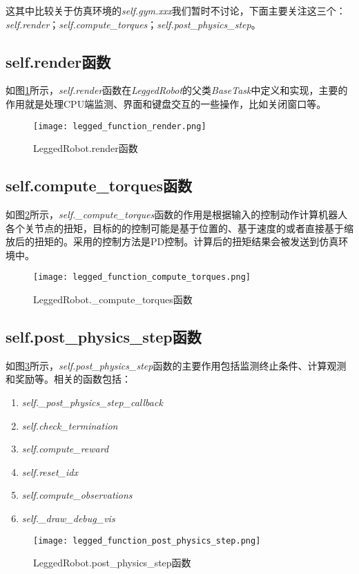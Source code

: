 这其中比较关于仿真环境的\emph{self.gym.xxx}我们暂时不讨论，下面主要关注这三个：\emph{self.render}；\emph{self.compute\_torques}；\emph{self.post\_physics\_step}。



\subsection[self.render函数]{self.render函数}
如图\ref{fig:legged_function_render}所示，\emph{self.render}函数在\emph{LeggedRobot}的父类\emph{BaseTask}中定义和实现，主要的作用就是处理CPU端监测、界面和键盘交互的一些操作，比如关闭窗口等。
\begin{figure}
  \centering
  \caption[LeggedRobot.render函数]{LeggedRobot.render函数}
  \label{fig:legged_function_render}
  \texttt{[image: legged\_function\_render.png]}
\end{figure}

\subsection[self.compute\_torques函数]{self.compute\_torques函数}
如图\ref{fig:legged_function_compute_torques}所示，\emph{self.\_compute\_torques}函数的作用是根据输入的控制动作计算机器人各个关节点的扭矩，目标的的控制可能是基于位置的、基于速度的或者直接基于缩放后的扭矩的。采用的控制方法是PD控制。计算后的扭矩结果会被发送到仿真环境中。
\begin{figure}
  \centering
  \caption[LeggedRobot.\_compute\_torques函数]{LeggedRobot.\_compute\_torques函数}
  \label{fig:legged_function_compute_torques}
  \texttt{[image: legged\_function\_compute\_torques.png]}
\end{figure}

\subsection[self.post\_physics\_step函数]{self.post\_physics\_step函数}
如图\ref{fig:legged_function_post_physics_step}所示，\emph{self.post\_physics\_step}函数的主要作用包括监测终止条件、计算观测和奖励等。相关的函数包括：\begin{enumerate}
  \item \emph{self.\_post\_physics\_step\_callback}
  \item \emph{self.check\_termination}
  \item \emph{self.compute\_reward}
  \item \emph{self.reset\_idx}
  \item \emph{self.compute\_observations}
  \item \emph{self.\_draw\_debug\_vis}
\end{enumerate}
\begin{figure}
  \centering
  \caption[LeggedRobot.post\_physics\_step函数]{LeggedRobot.post\_physics\_step函数}
  \label{fig:legged_function_post_physics_step}
  \texttt{[image: legged\_function\_post\_physics\_step.png]}
\end{figure}

